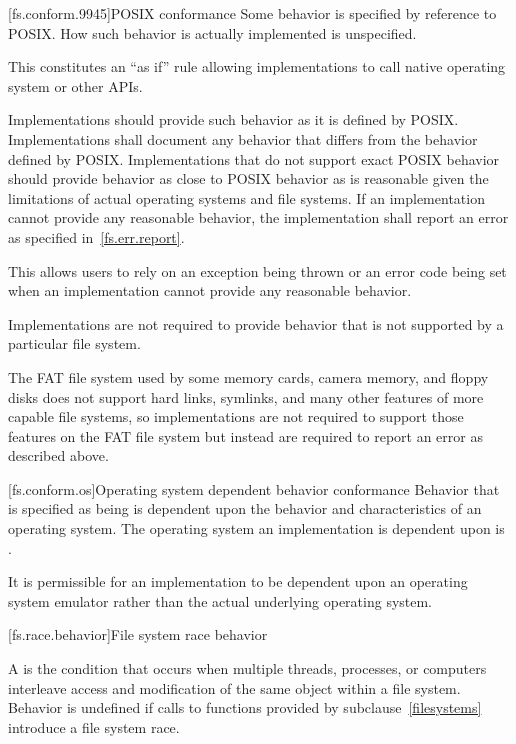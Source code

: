 [fs.conform.9945]{POSIX conformance}
\pnum
Some behavior is specified by reference to POSIX\@. How such behavior is actually implemented is unspecified.
\begin{note}
This constitutes an ``as if'' rule allowing implementations
to call native
operating system or other APIs.
\end{note}

\pnum
Implementations should provide such behavior as it is defined by
POSIX\@. Implementations shall document any behavior that differs from the
behavior defined by POSIX\@. Implementations that do not support exact POSIX
behavior should provide behavior as close to POSIX behavior as is reasonable given the
limitations of actual operating systems and file systems. If an implementation cannot provide any
reasonable behavior, the implementation shall report an error as specified in~\ref{fs.err.report}.
\begin{note}
This allows users to rely on an exception being thrown or
an error code being set when an implementation cannot provide any reasonable
behavior.
\end{note}

\pnum
Implementations are not required to provide behavior that is not supported by
a particular file system.
\begin{example}
The FAT file system used by some memory cards, camera memory, and
floppy disks does not support hard links, symlinks, and many other features of
more capable file systems, so implementations are not required to support those
features on the FAT file system
but instead are required to report an error as described above.
\end{example}

[fs.conform.os]{Operating system dependent behavior conformance}
\pnum
Behavior that is specified as being
is dependent upon the behavior
and characteristics of an operating system.
The operating system an
implementation is dependent upon is
.

\pnum
It is permissible for an implementation to be dependent upon an operating
system emulator rather than the actual underlying operating system.

[fs.race.behavior]{File system race behavior}

\pnum
A  is
the condition that occurs
when multiple threads, processes, or computers interleave access and
modification of
the same object within a file system.
Behavior is undefined if calls to functions provided by subclause~\ref{filesystems} introduce a file system race.

